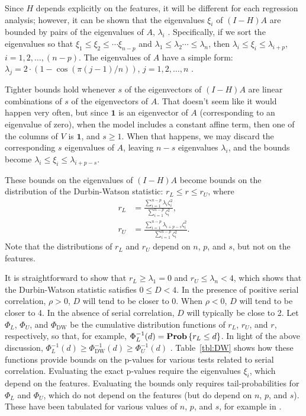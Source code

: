 \documentclass[12pt]{article}
\begin{document}
Since $H$ depends explicitly on the features, it will be different for each regression analysis; however, it can be shown that the eigenvalues $\xi_i$ of $(I-H)A$ are bounded by pairs of the eigenvalues of $A$, $\lambda_i$ \cite{DW:50}. Specifically, if we sort the eigenvalues so that $\xi_1 \leq \xi_2 \leq \cdots \xi_{n-p}$ and $\lambda_1 \leq \lambda_2 \cdots \leq \lambda_{n}$, then $\lambda_i \leq \xi_i \leq \lambda_{i+p}$, $i=1, 2, \ldots, (n-p)$. The eigenvalues of $A$ have a simple form: $\lambda_j = 2 \cdot ( 1 - \cos( \pi (j-1) / n))$, $j=1, 2, \ldots, n$ \cite[pg.~426]{DW:50}.

Tighter bounds hold whenever $s$ of the eigenvectors of $(I-H)A$ are linear combinations of $s$ of the eigenvectors of $A$. That doesn't seem like it would happen very often, but since $\mathbf{1}$ is an eigenvector of $A$ (corresponding to an eigenvalue of zero), when the model includes a constant affine term, then one of the columns of $V$ is $\mathbf{1}$, and $s \geq 1$. When that happens, we may discard the corresponding $s$ eigenvalues of $A$, leaving $n-s$ eigenvalues $\lambda_i$, and the bounds become $\lambda_i \leq \xi_i \leq \lambda_{i+p-s}$.

These bounds on the eigenvalues of $(I-H)A$ become bounds on the distribution of the Durbin-Watson statistic: $r_L \leq r \leq r_U$, where
\begin{align*}
   r_L &= \frac{\sum_{i=1}^{n-p} \lambda_i \zeta_i^2}{\sum_{i=1}^{n-p} \zeta_i^2}, \\
   r_U &= \frac{\sum_{i=1}^{n-p} \lambda_{i+p-s} \zeta_i^2}{\sum_{i=1}^{n-p} \zeta_i^2}.
\end{align*}
Note that the distributions of $r_L$ and $r_U$ depend on $n$, $p$, and $s$, but not on the features.

It is straightforward to show that $r_L \geq \lambda_1 = 0$ and $r_U \leq \lambda_n < 4$, which shows that the Durbin-Watson statistic satisfies $0 \leq D < 4$. In the presence of positive serial correlation, $\rho > 0$, $D$ will tend to be closer to 0. When $\rho < 0$, $D$ will tend to be closer to 4. In the absence of serial correlation, $D$ will typically be close to 2. Let $\Phi_L$, $\Phi_U$, and $\Phi_{\textrm{DW}}$ be the cumulative distribution functions of $r_L$, $r_U$, and $r$, respectively, so that, for example, $\Phi_L^{-1}(d) = \mathop{\bf Prob}\left\{ r_L \leq d \right\}$. In light of the above discussion, $\Phi_L^{-1}(d) \geq \Phi_{\textrm{DW}}^{-1}(d) \geq \Phi_U^{-1}(d)$ \cite[pg.~418]{DW:50}. Table~\ref{tbl:DW} shows how these functions provide bounds on the p-values for various tests related to serial correlation. Evaluating the exact p-values require the eigenvalues $\xi_i$, which depend on the features. Evaluating the bounds only requires tail-probabilities for $\Phi_L$ and $\Phi_U$, which do not depend on the features (but do depend on $n$, $p$, and $s$). These have been tabulated for various values of $n$, $p$, and $s$, for example in \cite{DW:51}.
\end{document}
